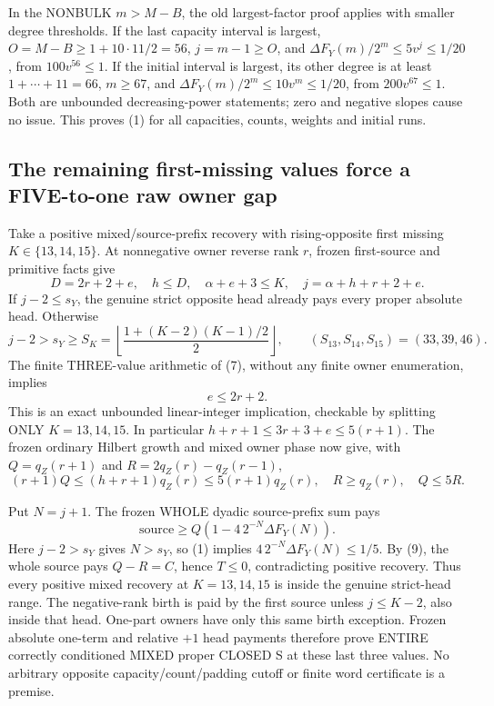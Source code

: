 In the NONBULK $m>M-B$, the old largest-factor proof applies with
smaller degree thresholds. If the last capacity interval is largest,
$O=M-B\ge1+10\cdot11/2=56$, $j=m-1\ge O$, and
$\Delta F_Y(m)/2^m\le5v^j\le1/20$, from $100v^{56}\le1$.
If the initial interval is largest, its other degree is at least
$1+\cdots+11=66$, $m\ge67$, and
$\Delta F_Y(m)/2^m\le10v^m\le1/20$, from $200v^{67}\le1$.
Both are unbounded decreasing-power statements; zero and negative
slopes cause no issue. This proves (1) for all capacities, counts, weights and initial runs.

\subsection{The remaining first-missing values force a FIVE-to-one raw owner gap}
Take a positive mixed/source-prefix recovery with rising-opposite
first missing $K\in\{13,14,15\}$. At nonnegative owner reverse rank
$r$, frozen first-source and primitive facts give
\[
 D=2r+2+e,\quad h\le D,\quad \alpha+e+3\le K,\quad
       j=\alpha+h+r+2+e.                              \tag{7}
\]
If $j-2\le s_Y$, the genuine strict opposite head already pays every
proper absolute head. Otherwise
\[
 j-2>s_Y\ge S_K=\left\lfloor\frac{1+(K-2)(K-1)/2}{2}\right\rfloor,
 \qquad(S_{13},S_{14},S_{15})=(33,39,46).
\]
The finite THREE-value arithmetic of (7), without any finite owner
enumeration, implies
\[
                               e\le2r+2.              \tag{8}
\]
This is an exact unbounded linear-integer implication, checkable by
splitting ONLY $K=13,14,15$. In particular
$h+r+1\le3r+3+e\le5(r+1)$.
The frozen ordinary Hilbert growth and mixed owner phase now give,
with $Q=q_Z(r+1)$ and $R=2q_Z(r)-q_Z(r-1)$,
\[
 (r+1)Q\le(h+r+1)q_Z(r)\le5(r+1)q_Z(r),\quad
                   R\ge q_Z(r),\quad\boxed{Q\le5R}.  \tag{9}
\]

Put $N=j+1$. The frozen WHOLE dyadic source-prefix sum pays
\[
             \text{source}\ge Q\left(1-4\,2^{-N}\Delta F_Y(N)\right).
\]
Here $j-2>s_Y$ gives $N>s_Y$, so (1) implies
$4\,2^{-N}\Delta F_Y(N)\le1/5$.
By (9), the whole source pays $Q-R=C$, hence $T\le0$, contradicting
positive recovery. Thus every positive mixed recovery at $K=13,14,15$
is inside the genuine strict-head range. The negative-rank birth is
paid by the first source unless $j\le K-2$, also inside that head.
One-part owners have only this same birth exception.
Frozen absolute one-term and relative $+1$ head payments therefore
prove ENTIRE correctly conditioned MIXED proper CLOSED S at these
last three values. No arbitrary opposite capacity/count/padding cutoff
or finite word certificate is a premise.

